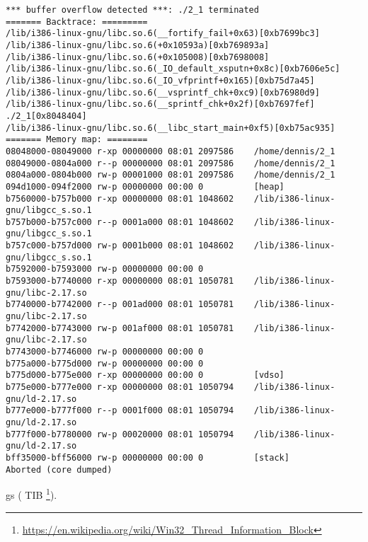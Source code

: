 \begin{lstlisting}
*** buffer overflow detected ***: ./2_1 terminated
======= Backtrace: =========
/lib/i386-linux-gnu/libc.so.6(__fortify_fail+0x63)[0xb7699bc3]
/lib/i386-linux-gnu/libc.so.6(+0x10593a)[0xb769893a]
/lib/i386-linux-gnu/libc.so.6(+0x105008)[0xb7698008]
/lib/i386-linux-gnu/libc.so.6(_IO_default_xsputn+0x8c)[0xb7606e5c]
/lib/i386-linux-gnu/libc.so.6(_IO_vfprintf+0x165)[0xb75d7a45]
/lib/i386-linux-gnu/libc.so.6(__vsprintf_chk+0xc9)[0xb76980d9]
/lib/i386-linux-gnu/libc.so.6(__sprintf_chk+0x2f)[0xb7697fef]
./2_1[0x8048404]
/lib/i386-linux-gnu/libc.so.6(__libc_start_main+0xf5)[0xb75ac935]
======= Memory map: ========
08048000-08049000 r-xp 00000000 08:01 2097586    /home/dennis/2_1
08049000-0804a000 r--p 00000000 08:01 2097586    /home/dennis/2_1
0804a000-0804b000 rw-p 00001000 08:01 2097586    /home/dennis/2_1
094d1000-094f2000 rw-p 00000000 00:00 0          [heap]
b7560000-b757b000 r-xp 00000000 08:01 1048602    /lib/i386-linux-gnu/libgcc_s.so.1
b757b000-b757c000 r--p 0001a000 08:01 1048602    /lib/i386-linux-gnu/libgcc_s.so.1
b757c000-b757d000 rw-p 0001b000 08:01 1048602    /lib/i386-linux-gnu/libgcc_s.so.1
b7592000-b7593000 rw-p 00000000 00:00 0
b7593000-b7740000 r-xp 00000000 08:01 1050781    /lib/i386-linux-gnu/libc-2.17.so
b7740000-b7742000 r--p 001ad000 08:01 1050781    /lib/i386-linux-gnu/libc-2.17.so
b7742000-b7743000 rw-p 001af000 08:01 1050781    /lib/i386-linux-gnu/libc-2.17.so
b7743000-b7746000 rw-p 00000000 00:00 0
b775a000-b775d000 rw-p 00000000 00:00 0
b775d000-b775e000 r-xp 00000000 00:00 0          [vdso]
b775e000-b777e000 r-xp 00000000 08:01 1050794    /lib/i386-linux-gnu/ld-2.17.so
b777e000-b777f000 r--p 0001f000 08:01 1050794    /lib/i386-linux-gnu/ld-2.17.so
b777f000-b7780000 rw-p 00020000 08:01 1050794    /lib/i386-linux-gnu/ld-2.17.so
bff35000-bff56000 rw-p 00000000 00:00 0          [stack]
Aborted (core dumped)
\end{lstlisting}

gs\EMDASH{}
(
\ac{TIB} \footnote{\url{https://en.wikipedia.org/wiki/Win32_Thread_Information_Block}}). 

